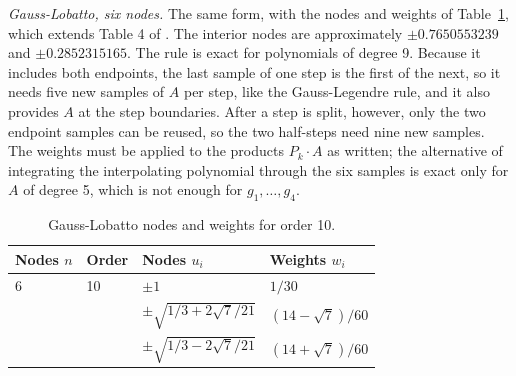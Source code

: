 \documentclass[12pt]{article}
\begin{document}
\emph{Gauss-Lobatto, six nodes.} The same form, with the nodes and weights of Table~\ref{tab:lo6}, which extends Table 4 of \cite{j28}. The interior nodes are approximately $\pm0.7650553239$ and $\pm0.2852315165$. The rule is exact for polynomials of degree 9. Because it includes both endpoints, the last sample of one step is the first of the next, so it needs five new samples of $A$ per step, like the Gauss-Legendre rule, and it also provides $A$ at the step boundaries. After a step is split, however, only the two endpoint samples can be reused, so the two half-steps need nine new samples. The weights must be applied to the products $P_k\cdot A$ as written; the alternative of integrating the interpolating polynomial through the six samples is exact only for $A$ of degree 5, which is not enough for $g_1,\ldots,g_4$.

\begin{table}[H]
\centering\small
\caption{Gauss-Lobatto nodes and weights for order 10.}\label{tab:lo6}
\begin{tabular}{llll}
\hline
Nodes $n$ & Order & Nodes $u_i$ & Weights $w_i$ \\ \hline
6 & 10 & $\pm1$ & $1/30$ \\
 &  & $\pm\sqrt{1/3+2\sqrt{7}/21}$ & $(14-\sqrt{7})/60$ \\
 &  & $\pm\sqrt{1/3-2\sqrt{7}/21}$ & $(14+\sqrt{7})/60$ \\ \hline
\end{tabular}
\end{table}
\end{document}
